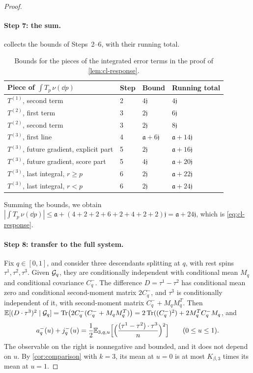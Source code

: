 \begin{proof}
\paragraph{Step 7: the sum.}
 collects the bounds of Steps~2--6, with their
running total.

\begin{table}[ht]
\centering\small
\begin{tabular}{@{}llll@{}}
\toprule
Piece of $\int T_p\,\nu(\dd p)$ & Step & Bound & Running total\\
\midrule
$T^{(1)}$, second term & 2 & $4\mathfrak j$ & $4\mathfrak j$\\
$T^{(2)}$, first term & 3 & $2\mathfrak j$ & $6\mathfrak j$\\
$T^{(2)}$, second term & 3 & $2\mathfrak j$ & $8\mathfrak j$\\
$T^{(3)}$, first line & 4 & $\mathfrak a+6\mathfrak j$ & $\mathfrak a+14\mathfrak j$\\
$T^{(3)}$, future gradient, explicit part & 5 & $2\mathfrak j$ & $\mathfrak a+16\mathfrak j$\\
$T^{(3)}$, future gradient, score part & 5 & $4\mathfrak j$ & $\mathfrak a+20\mathfrak j$\\
$T^{(3)}$, last integral, $r\ge p$ & 6 & $2\mathfrak j$ & $\mathfrak a+22\mathfrak j$\\
$T^{(3)}$, last integral, $r<p$ & 6 & $2\mathfrak j$ & $\mathfrak a+24\mathfrak j$\\
\bottomrule
\end{tabular}
\caption{Bounds for the pieces of the integrated error terms in the
proof of \cref{lem:cl-response}.}
\label{tab:c7-response}
\end{table}

Summing the bounds, we obtain
$|\int T_p\,\nu(\dd p)|\le\mathfrak a+(4+2+2+6+2+4+2+2)\mathfrak j
=\mathfrak a+24\mathfrak j$, which is \eqref{eq:cl-response}.

\paragraph{Step 8: transfer to the full system.}
Fix $q\in[0,1]$, and consider three descendants splitting at $q$, with
rest spins $\tau^1,\tau^2,\tau^3$. Given $\mathcal G_q$, they are
conditionally independent with conditional mean $M_q$ and conditional
covariance $C_q^-$. The difference $D=\tau^1-\tau^2$ has conditional
mean zero and conditional second-moment matrix $2C_q^-$, and $\tau^3$
is conditionally independent of it, with second-moment matrix
$C_q^-+M_qM_q^T$. Then
$\mathbb E[(D\cdot\tau^3)^2\mid\mathcal G_q]=\operatorname{Tr}\bigl(2C_q^-(C_q^-+M_qM_q^T)\bigr)
=2\operatorname{Tr}((C_q^-)^2)+2M_q^TC_q^-M_q$, and
\[
 a_q^-(u)+j_q^-(u)
 =\frac12\mathbb E_{3,q,u}\Bigl[\Bigl(\frac{(\tau^1-\tau^2)\cdot\tau^3}n\Bigr)^2
 \Bigr]\qquad(0\le u\le1).
\]
The observable on the right is nonnegative and bounded, and it does not
depend on $u$. By \cref{cor:comparison} with $k=3$, its mean at $u=0$
is at most $K_{\beta,3}$ times its mean at $u=1$.


\end{proof}
